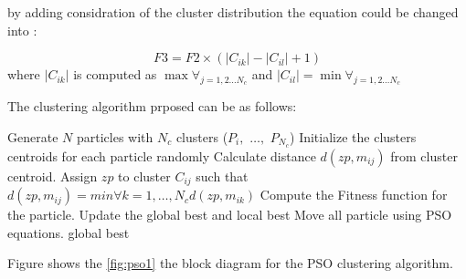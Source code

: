 \documentclass[a4paper,twoside]{article}
\begin{document}
by adding considration of the cluster distribution the equation could be changed into :

\begin{equation}
F3 =  F2\times \left(\left|{C_{ik} }\right|-\left|{C_{il} }\right|+1 \right)
\end{equation}
where $\left|{C_{ik} }\right|$ is computed as $\max\forall_{j=1,2 \dots N_c}$ and $\left|{C_{il} }\right|=\min\forall_{j=1,2 \dots N_c}$   



The clustering algorithm prposed can be as follows:
\begin{algorithmic}
\STATE  Generate $N$ particles with $N_c$ clusters  ($P_i,$ $\dots,$ $P_{N_c}$)
\STATE Initialize the clusters centroids for each particle randomly
        \STATE   Calculate distance $d(zp,m_{ij})$ from cluster centroid.
        \STATE   Assign $zp$ to cluster $C_{ij}$ such that
        \STATE   $d(zp,m_{ij})=min \forall k=1,\dots,N_c {d(zp,m_{ik})}$
    \ENDFOR
    \STATE  Compute the Fitness function for the particle.
     \STATE  Update the global best and local best
     \STATE  Move all particle using PSO equations.
     \ENDFOR
  \ENDFOR
 \RETURN global best

 \end{algorithmic}

 Figure shows the \ref{fig:pso1} the block diagram for the PSO clustering algorithm. 
\end{document}
